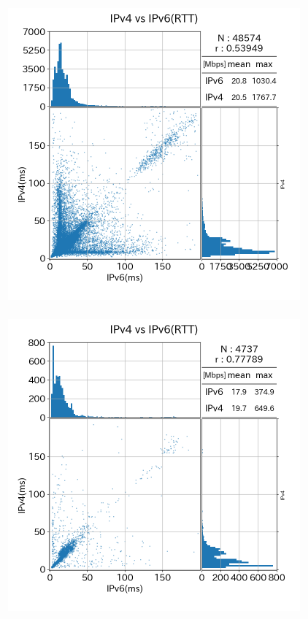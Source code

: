 \begin{figure}[htbp]
\begin{center}
\begin{minipage}[t]{0.48\textwidth}
\begin{center}
\begin{subfigure}[b]{\textwidth}
                \end{subfigure}
            \caption{(1)のRTT}
            \label{fig:old_Line_rtt}
            \end{center}
        \end{minipage}
        \hfill
        \begin{minipage}[t]{0.48\textwidth}
            \begin{subfigure}[b]{\textwidth}
                \centering
                \includegraphics[width=0.85\textwidth]{fig/new_FTTH_rtt.png}
                \label{new_FTTH_rtt}
            \end{subfigure}
            \begin{subfigure}[b]{\textwidth}
                \centering
                \includegraphics[width=0.85\textwidth]{fig/new_CATV_rtt.png}

\end{subfigure}
\end{minipage}
\end{center}
\end{figure}

